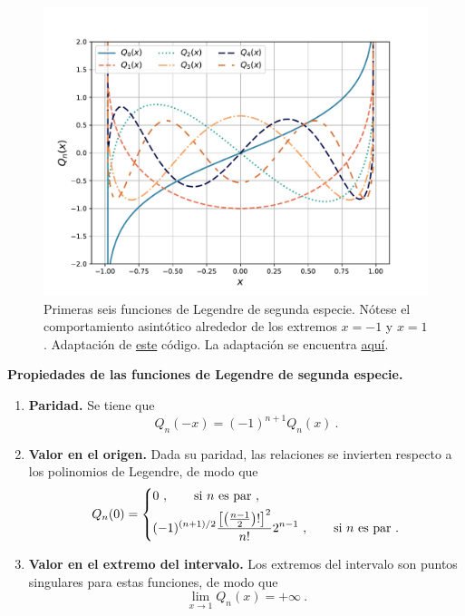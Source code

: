 \begin{figure}[htbp]
    \centering
    \includegraphics[width=12cm]{Figuras/Legendre-second-kind.pdf}
    \caption{Primeras seis funciones de Legendre de segunda especie. Nótese el comportamiento asintótico alrededor de los extremos $x = -1$ y $x=1$. Adaptación de \href{https://github.com/gfrubi/FM2/blob/master/figuras-editables/fig-Legendre.py}{este} código. La adaptación se encuentra \href{https://github.com/Pedroga-cc/Fisica-Matematica-II/blob/main/Figuras/Plotter_Legendre.py}{aquí}.}
    \label{fig:Legendre-second-kind}
\end{figure}

\begin{propiedad}
    \textbf{Propiedades de las funciones de Legendre de segunda especie.}

    \begin{enumerate}
        \item \textbf{Paridad.} Se tiene que
        \begin{equation}
            Q_n(-x) = (-1)^{n+1} Q_n(x) \ .
        \end{equation}
        \item \textbf{Valor en el origen.} Dada su paridad, las relaciones se invierten respecto a los polinomios de Legendre, de modo que
        \begin{equation}
            Q_n(0) = \begin{dcases}
                0 \ , \qquad \text{si } n \text{ es par} \ , \\
                (-1)^{(n+1)/2} \frac{\left[ \left( \frac{n-1}{2} \right)! \right]^2}{n!} 2^{n-1} \ , \qquad \text{si } n \text{ es par} \ .  
            \end{dcases}
        \end{equation}
        \item \textbf{Valor en el extremo del intervalo.} Los extremos del intervalo son puntos singulares para estas funciones, de modo que
        \begin{equation}
            \lim_{x \to 1} Q_n(x) = +\infty \ .
        \end{equation}
    \end{enumerate} 
\end{propiedad}

